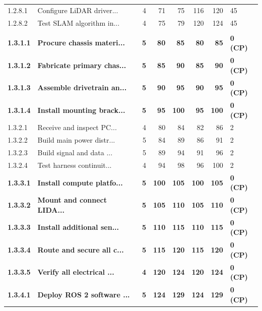\begin{longtable}{@{}llrrrrrl@{}}
1.2.8.1 & Configure LiDAR driver... & 4 & 71 & 75 & 116 & 120 & 45 \\
1.2.8.2 & Test SLAM algorithm in... & 4 & 75 & 79 & 120 & 124 & 45 \\
\addlinespace
\multicolumn{8}{l}{\textbf{Build Phase}} \\
\addlinespace
\textbf{1.3.1.1} & \textbf{Procure chassis materi...} & \textbf{5} & \textbf{80} & \textbf{85} & \textbf{80} & \textbf{85} & \textbf{0 (CP)} \\
\textbf{1.3.1.2} & \textbf{Fabricate primary chas...} & \textbf{5} & \textbf{85} & \textbf{90} & \textbf{85} & \textbf{90} & \textbf{0 (CP)} \\
\textbf{1.3.1.3} & \textbf{Assemble drivetrain an...} & \textbf{5} & \textbf{90} & \textbf{95} & \textbf{90} & \textbf{95} & \textbf{0 (CP)} \\
\textbf{1.3.1.4} & \textbf{Install mounting brack...} & \textbf{5} & \textbf{95} & \textbf{100} & \textbf{95} & \textbf{100} & \textbf{0 (CP)} \\
1.3.2.1 & Receive and inspect PC... & 4 & 80 & 84 & 82 & 86 & 2 \\
1.3.2.2 & Build main power distr... & 5 & 84 & 89 & 86 & 91 & 2 \\
1.3.2.3 & Build signal and data ... & 5 & 89 & 94 & 91 & 96 & 2 \\
1.3.2.4 & Test harness continuit... & 4 & 94 & 98 & 96 & 100 & 2 \\
\textbf{1.3.3.1} & \textbf{Install compute platfo...} & \textbf{5} & \textbf{100} & \textbf{105} & \textbf{100} & \textbf{105} & \textbf{0 (CP)} \\
\textbf{1.3.3.2} & \textbf{Mount and connect LIDA...} & \textbf{5} & \textbf{105} & \textbf{110} & \textbf{105} & \textbf{110} & \textbf{0 (CP)} \\
\textbf{1.3.3.3} & \textbf{Install additional sen...} & \textbf{5} & \textbf{110} & \textbf{115} & \textbf{110} & \textbf{115} & \textbf{0 (CP)} \\
\textbf{1.3.3.4} & \textbf{Route and secure all c...} & \textbf{5} & \textbf{115} & \textbf{120} & \textbf{115} & \textbf{120} & \textbf{0 (CP)} \\
\textbf{1.3.3.5} & \textbf{Verify all electrical ...} & \textbf{4} & \textbf{120} & \textbf{124} & \textbf{120} & \textbf{124} & \textbf{0 (CP)} \\
\textbf{1.3.4.1} & \textbf{Deploy ROS 2 software ...} & \textbf{5} & \textbf{124} & \textbf{129} & \textbf{124} & \textbf{129} & \textbf{0 (CP)} \\

\end{longtable}
